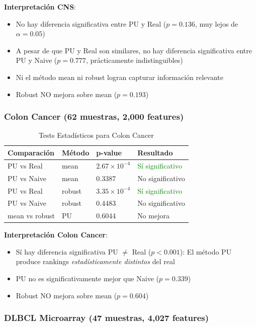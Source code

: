 \documentclass[a4paper,11pt]{article}
\begin{document}
\textbf{Interpretación CNS}: 
\begin{itemize}
    \item No hay diferencia significativa entre PU y Real ($p=0.136$, muy lejos de $\alpha=0.05$)
    \item A pesar de que PU y Real son similares, no hay diferencia significativa entre PU y Naive ($p=0.777$, prácticamente indistinguibles)
    \item Ni el método mean ni robust logran capturar información relevante
    \item Robust NO mejora sobre mean ($p=0.193$)
\end{itemize}

\subsubsection{Colon Cancer (62 muestras, 2{,}000 features)}

\begin{table}[H]
\centering
\caption{Tests Estadísticos para Colon Cancer}
\begin{tabular}{llll}
\toprule
Comparación & Método & p-value & Resultado \\
\midrule
PU vs Real & mean & $2.67 \times 10^{-4}$ & \textcolor{green}{Sí significativo} \\
PU vs Naive & mean & 0.3387 & {No significativo} \\
PU vs Real & robust & $3.35 \times 10^{-4}$ & \textcolor{green}{Sí significativo} \\
PU vs Naive & robust & 0.4483 & {No significativo} \\
mean vs robust & PU & 0.6044 & {No mejora} \\
\bottomrule
\end{tabular}
\end{table}

\textbf{Interpretación Colon Cancer}:
\begin{itemize}
    \item Sí hay diferencia significativa PU $\neq$ Real ($p < 0.001$): El método PU produce rankings \textit{estadísticamente distintos} del real
    \item PU no es significativamente mejor que Naive ($p=0.339$)
    \item Robust NO mejora sobre mean ($p=0.604$)
\end{itemize}

\subsubsection{DLBCL Microarray (47 muestras, 4{,}027 features)}
\end{document}
